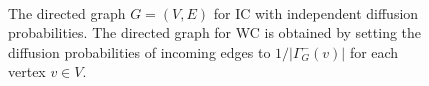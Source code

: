 \documentclass[final,5p,times,twocolumn]{elsarticle}
\newcommand\kktodo[1]{\textcolor{red}{#1}}
\newcommand\ggx[1]{\textcolor{blue}{#1}}
\newcommand\fixme[1]{#1}
\begin{document}
\begin{figure}[!ht] 
    \centering
    \\%
  \caption{\small{\protect{} 
The directed graph $G = (V, E)$ for IC with independent diffusion probabilities. 
\protect{}
The directed graph for WC is obtained by setting the diffusion probabilities of incoming edges to $1 / |\Gamma^-_G(v)|$ for each vertex $v \in V$.%
  }}
  \label{fig:xx} 
\end{figure}
\end{document}
